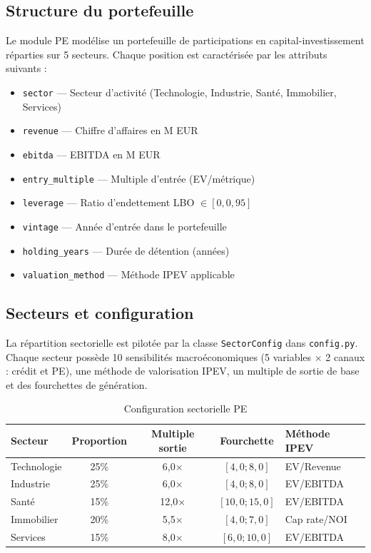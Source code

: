 \documentclass[12pt,a4paper]{article}
\begin{document}
\subsection{Structure du portefeuille}

Le module PE mod\'{e}lise un portefeuille de participations en capital-investissement
r\'{e}parties sur 5 secteurs. Chaque position est caract\'{e}ris\'{e}e par les attributs suivants :

\begin{definitionbox}
\begin{itemize}[nosep]
    \item \texttt{sector} --- Secteur d'activit\'{e} (Technologie, Industrie, Sant\'{e}, Immobilier, Services)
    \item \texttt{revenue} --- Chiffre d'affaires en M EUR
    \item \texttt{ebitda} --- EBITDA en M EUR
    \item \texttt{entry\_multiple} --- Multiple d'entr\'{e}e (EV/m\'{e}trique)
    \item \texttt{leverage} --- Ratio d'endettement LBO $\in [0, 0{,}95]$
    \item \texttt{vintage} --- Ann\'{e}e d'entr\'{e}e dans le portefeuille
    \item \texttt{holding\_years} --- Dur\'{e}e de d\'{e}tention (ann\'{e}es)
    \item \texttt{valuation\_method} --- M\'{e}thode IPEV applicable
\end{itemize}
\end{definitionbox}

\subsection{Secteurs et configuration}

La r\'{e}partition sectorielle est pilot\'{e}e par la classe \texttt{SectorConfig} dans \texttt{config.py}.
Chaque secteur poss\`{e}de 10 sensibilit\'{e}s macro\'{e}conomiques (5 variables $\times$ 2 canaux : cr\'{e}dit et PE),
une m\'{e}thode de valorisation IPEV, un multiple de sortie de base et des fourchettes de g\'{e}n\'{e}ration.

\begin{table}[h]
\centering
\caption{Configuration sectorielle PE}
\label{tab:sectors}
\begin{tabular}{lcccl}
\toprule
\textbf{Secteur} & \textbf{Proportion} & \textbf{Multiple sortie} & \textbf{Fourchette} & \textbf{M\'{e}thode IPEV} \\
\midrule
Technologie & 25\% & 6{,}0$\times$ & $[4{,}0 ; 8{,}0]$ & EV/Revenue \\
Industrie   & 25\% & 6{,}0$\times$ & $[4{,}0 ; 8{,}0]$ & EV/EBITDA \\
Sant\'{e}      & 15\% & 12{,}0$\times$ & $[10{,}0 ; 15{,}0]$ & EV/EBITDA \\
Immobilier  & 20\% & 5{,}5$\times$ & $[4{,}0 ; 7{,}0]$ & Cap rate/NOI \\
Services    & 15\% & 8{,}0$\times$ & $[6{,}0 ; 10{,}0]$ & EV/EBITDA \\
\bottomrule
\end{tabular}
\end{table}
\end{document}
